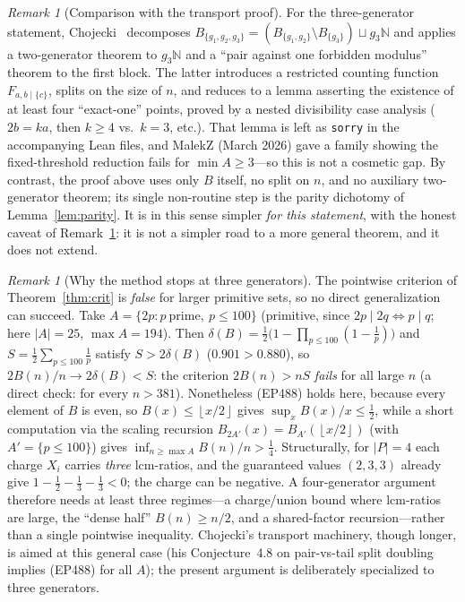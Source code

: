 \documentclass[11pt]{article}
\theoremstyle{remark}
\newtheorem{remark}[theorem]{Remark}
\newcommand{\N}{\mathbb{N}}
\newcommand{\floor}[1]{\left\lfloor #1 \right\rfloor}
\newcommand{\dens}{\delta}          %
\begin{document}
\begin{remark}[Comparison with the transport proof]
For the three-generator statement, Chojecki~\cite{Chojecki} decomposes
$B_{\{g_1,g_2,g_3\}}=(B_{\{g_1,g_2\}}\setminus B_{\{g_3\}})\sqcup g_3\N$ and
applies a two-generator theorem to $g_3\N$ and a ``pair against one forbidden
modulus'' theorem to the first block. The latter introduces a restricted counting
function $F_{a,b\mid\{c\}}$, splits on the size of $n$, and reduces to a lemma
asserting the existence of at least four ``exact-one'' points, proved by a nested
divisibility case analysis ($2b=ka$, then $k\ge 4$ vs.\ $k=3$, etc.). That lemma
is left as \texttt{sorry} in the accompanying Lean files, and MalekZ (March 2026)
gave a family showing the fixed-threshold reduction fails for $\min A\ge 3$---so
this is not a cosmetic gap. By contrast, the proof above uses only $B$ itself, no split on
$n$, and no auxiliary two-generator theorem; its single non-routine step is the
parity dichotomy of Lemma~\ref{lem:parity}. It is in this sense simpler
\emph{for this statement}, with the honest caveat of Remark~\ref{rem:four}: it is
not a simpler road to a more general theorem, and it does not extend.
\end{remark}

\begin{remark}[Why the method stops at three generators]\label{rem:four}
The pointwise criterion of Theorem~\ref{thm:crit} is \emph{false} for larger
primitive sets, so no direct generalization can succeed. Take
$A=\{2p: p\ \text{prime},\ p\le 100\}$ (primitive, since $2p\mid 2q\iff p\mid q$;
here $|A|=25$, $\max A=194$). Then $\dens(B)=\tfrac12\bigl(1-\prod_{p\le 100}
(1-\tfrac1p)\bigr)$ and $S=\tfrac12\sum_{p\le 100}\tfrac1p$ satisfy
$S>2\dens(B)$ ($0.901>0.880$), so $2B(n)/n\to 2\dens(B)<S$: the criterion
$2B(n)>nS$ \emph{fails} for all large $n$ (a direct check: for every $n>381$).
Nonetheless (EP488) holds here, because every element of $B$ is even, so
$B(x)\le\floor{x/2}$ gives $\sup_x B(x)/x\le\tfrac12$, while a short computation via
the scaling recursion $B_{2A'}(x)=B_{A'}(\floor{x/2})$ (with $A'=\{p\le 100\}$)
gives $\inf_{n\ge\max A}B(n)/n>\tfrac14$. Structurally, for $|P|=4$ each charge
$X_i$ carries \emph{three} lcm-ratios, and the guaranteed values $(2,3,3)$ already
give $1-\tfrac12-\tfrac13-\tfrac13<0$; the charge can be negative. A four-generator
argument therefore needs at least three regimes---a charge/union bound where
lcm-ratios are large, the ``dense half'' $B(n)\ge n/2$, and a shared-factor
recursion---rather than a single pointwise inequality. Chojecki's transport
machinery, though longer, is aimed at this general case (his Conjecture~4.8 on
pair-vs-tail split doubling implies (EP488) for all $A$); the present argument is
deliberately specialized to three generators.
\end{remark}
\end{document}
